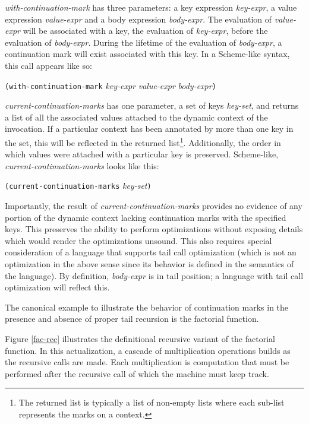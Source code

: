 \documentclass[ms,electronic,twosidetoc,letterpaper,chaptercenter,parttop]{byumsphd}
\begin{document}
\emph{with-continuation-mark} has three parameters: a key expression \emph{key-expr}, a 
value expression \emph{value-expr} and a body expression \emph{body-expr}. The evaluation 
of \emph{value-expr} will be associated with a key, the evaluation of \emph{key-expr}, 
before the evaluation of \emph{body-expr}. During the lifetime of the evaluation of 
\emph{body-expr}, a continuation mark will exist associated with this key. In a Scheme-like 
syntax, this call appears like so:

\texttt{(with-continuation-mark} \emph{key-expr} \emph{value-expr} \emph{body-expr}\texttt{)}

\emph{current-continuation-marks} has one parameter, a set of keys \emph{key-set}, and returns a list of
all the associated values attached to the dynamic context of the invocation. If a particular 
context has been annotated by more than one key in the set, this will be reflected in the 
returned list\footnote{The returned list is typically a list of non-empty lists where each 
sub-list represents the marks on a context.}. Additionally, the order in which values were 
attached with a particular key is preserved. Scheme-like, \emph{current-continuation-marks}
looks like this:

\texttt{(current-continuation-marks} \emph{key-set}\texttt{)}

Importantly, the result of \emph{current-continuation-marks} provides no evidence of any portion of the
dynamic context lacking continuation marks with the specified keys. This preserves the
ability to perform optimizations without exposing details which would render the
optimizations unsound. This also requires special consideration of a language that
supports tail call optimization (which is not an optimization in the above sense since its
behavior is defined in the semantics of the language). By definition, \emph{body-expr} is 
in tail position; a language with tail call optimization will reflect this.

The canonical example to illustrate the behavior of continuation marks in the presence and
absence of proper tail recursion is the factorial function.

Figure \ref{fac-rec} illustrates the definitional recursive variant of the factorial
function. In this actualization, a cascade of multiplication operations builds as the
recursive calls are made. Each multiplication is computation that must be performed after
the recursive call of which the machine must keep track.
\end{document}
